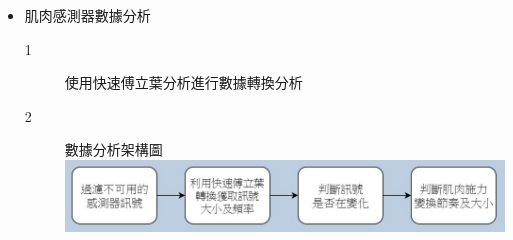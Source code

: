 \documentclass[a0paper,portrait]{baposter}
\begin{document}
\begin{poster}
{\begin{itemize}
\item 肌肉感測器數據分析
\begin{description}
\item[1] 使用快速傅立葉分析進行數據轉換分析
\item[2] 數據分析架構圖 \\
\includegraphics[scale=0.55]{Muscle.JPG}
\end{description}

\end{itemize}
}


\end{poster}
\end{document}
